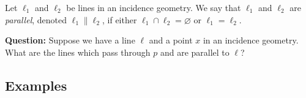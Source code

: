 \documentclass{article}
\begin{document}

\begin{dfn}[Parallel]
Let $\ell_1$ and $\ell_2$ be lines in an incidence geometry. We say that $\ell_1$ and $\ell_2$ are \emph{parallel}, denoted $\ell_1 \parallel \ell_2$, if either $\ell_1 \cap \ell_2 = \varnothing$ or $\ell_1 = \ell_2$.
\end{dfn}

\textbf{Question:} Suppose we have a line $\ell$ and a point $x$ in an incidence geometry. What are the lines which pass through $p$ and are parallel to $\ell$?

\subsection*{Examples}
\end{document}
